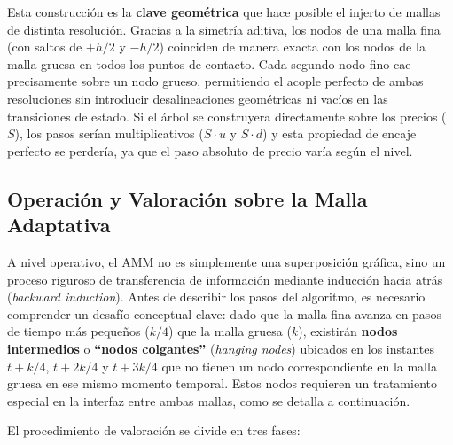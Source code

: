 Esta construcción es la \textbf{clave geométrica} que hace posible el injerto de mallas de distinta resolución. Gracias a la simetría aditiva, los nodos de una malla fina (con saltos de $+h/2$ y $-h/2$) coinciden de manera exacta con los nodos de la malla gruesa en todos los puntos de contacto. Cada segundo nodo fino cae precisamente sobre un nodo grueso, permitiendo el acople perfecto de ambas resoluciones sin introducir desalineaciones geométricas ni vacíos en las transiciones de estado. Si el árbol se construyera directamente sobre los precios ($S$), los pasos serían multiplicativos ($S \cdot u$ y $S \cdot d$) y esta propiedad de encaje perfecto se perdería, ya que el paso absoluto de precio varía según el nivel.

\subsection{Operación y Valoración sobre la Malla Adaptativa}

A nivel operativo, el AMM no es simplemente una superposición gráfica, sino un proceso riguroso de transferencia de información mediante inducción hacia atrás (\textit{backward induction}). Antes de describir los pasos del algoritmo, es necesario comprender un desafío conceptual clave: dado que la malla fina avanza en pasos de tiempo más pequeños ($k/4$) que la malla gruesa ($k$), existirán \textbf{nodos intermedios} o \textbf{``nodos colgantes''} (\textit{hanging nodes}) ubicados en los instantes $t+k/4$, $t+2k/4$ y $t+3k/4$ que no tienen un nodo correspondiente en la malla gruesa en ese mismo momento temporal. Estos nodos requieren un tratamiento especial en la interfaz entre ambas mallas, como se detalla a continuación.

El procedimiento de valoración se divide en tres fases:

